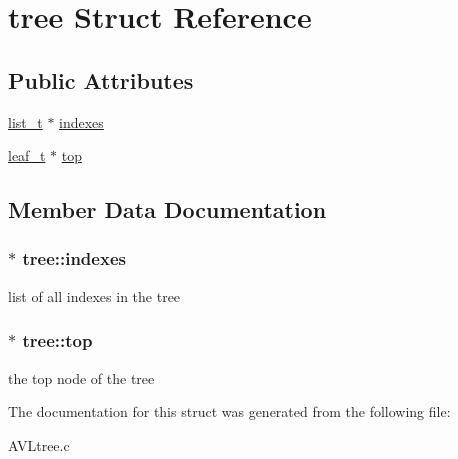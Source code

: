 \hypertarget{structtree}{}\section{tree Struct Reference}
\label{structtree}
\subsection*{Public Attributes}
\begin{DoxyCompactItemize}
\item 
\hyperlink{structlist}{list\+\_\+t} $\ast$ \hyperlink{structtree_a0ab4a869f1bb3823500bc052b422d9cd}{indexes}
\item 
\hyperlink{structleaf}{leaf\+\_\+t} $\ast$ \hyperlink{structtree_a8692b126297e928f661cbe314e4349de}{top}
\end{DoxyCompactItemize}


\subsection{Member Data Documentation}
\hypertarget{structtree_a0ab4a869f1bb3823500bc052b422d9cd}{}
\subsubsection[{indexes}]{$\ast$ tree\+::indexes}\label{structtree_a0ab4a869f1bb3823500bc052b422d9cd}
list of all indexes in the tree \hypertarget{structtree_a8692b126297e928f661cbe314e4349de}{}
\subsubsection[{top}]{$\ast$ tree\+::top}\label{structtree_a8692b126297e928f661cbe314e4349de}
the top node of the tree 

The documentation for this struct was generated from the following file\+:\begin{DoxyCompactItemize}
\item 
A\+V\+Ltree.\+c\end{DoxyCompactItemize}
